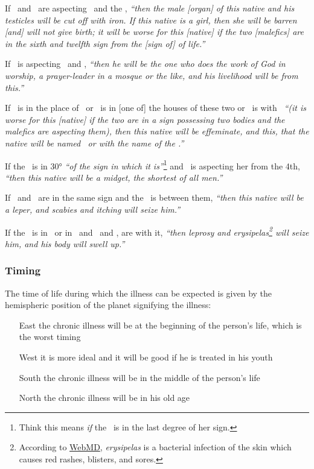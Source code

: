 If  \Mars\, and \Saturn\, are aspecting \Venus\, and the \Moon, \textsl{``then the male [organ] of this native and his testicles will be cut off with iron. If this native is a girl, then she will be barren [and] will not give birth; it will be worse for this [native] if the two [malefics] are in the sixth and twelfth sign from the [sign of] of life.''}

If  \Jupiter\, is aspecting \Mars\, and \Saturn, \textsl{``then he will be the one who does the work of God in worship, a prayer-leader in a mosque or the like, and his livelihood will be from this.''}

If  \Jupiter\, is in the place of \Venus\, or \Mercury\, is in [one of] the houses of these two or \Mercury\, is with \Jupiter\, \textsl{``(it is worse for this [native] if the two are in a sign possessing two bodies and the malefics are aspecting them), then this native will be effeminate, and this, that the native will be named \Mercury\, or with the name of the \Moon.''}

If  the \Moon\, is in 30° \textsl{``of the sign in which it is''}\footnote{Think this means \textsl{if} the \Moon\, is in the last degree of her sign.} and \Saturn\, is aspecting her from the 4th, \textsl{``then this native will be a midget, the shortest of all men.''}

If  \Saturn\, and \Mars\, are in the same sign and the \Moon\, is between them, \textsl{``then this native will be a leper, and scabies and itching will seize him.''}

If  the \Moon\, is in \Aries\, or in \Taurus\, and \Saturn\, and \Mars, are with it,  \textsl{``then leprosy and erysipelas\footnote{According to \href{https://www.webmd.com/skin-problems-and-treatments/what-is-erysipelas}{WebMD}, \textsl{erysipelas} is a bacterial infection of the skin which causes red rashes, blisters, and sores.} will seize him, and his body will swell up.''}

\subsubsection{Timing}

The  time of life during which the illness can be expected is given by the hemispheric position of the planet signifying the illness: 

\begin{itemize}[topsep=0em,itemsep=0em]
\item[East] the chronic illness will be at the beginning of the person's life, which is the worst timing
\item[West] it is more ideal and it will be good if he is treated in his youth
\item[South] the chronic illness will be in the middle of the person's life
\item[North] the chronic illness will be in his old age
\end{itemize}







